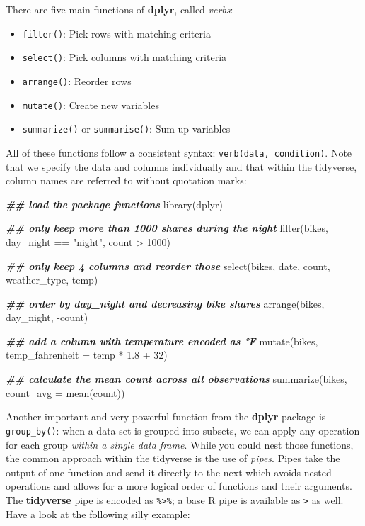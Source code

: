 \documentclass[
]{krantz}
\makeatletter
\newenvironment{Shaded}{\begin{snugshade}}{\end{snugshade}}
\newcommand{\AttributeTok}[1]{\textcolor[rgb]{0.61,0.61,0.61}{#1}}
\newcommand{\DecValTok}[1]{\textcolor[rgb]{0.06,0.06,0.06}{#1}}
\newcommand{\DocumentationTok}[1]{\textcolor[rgb]{0.37,0.37,0.37}{\textbf{\textit{#1}}}}
\newcommand{\FloatTok}[1]{\textcolor[rgb]{0.06,0.06,0.06}{#1}}
\newcommand{\FunctionTok}[1]{\textcolor[rgb]{0,0,0}{#1}}
\newcommand{\NormalTok}[1]{#1}
\newcommand{\SpecialCharTok}[1]{\textcolor[rgb]{0,0,0}{#1}}
\newcommand{\StringTok}[1]{\textcolor[rgb]{0.5,0.5,0.5}{#1}}
\providecommand{\tightlist}{%
  \setlength{\itemsep}{0pt}\setlength{\parskip}{0pt}}
\newenvironment{kframe}{%
\medskip{}
\setlength{\fboxsep}{.8em}
 \def\at@end@of@kframe{}%
 \ifinner\ifhmode%
  \def\at@end@of@kframe{\end{minipage}}%
  \begin{minipage}{\columnwidth}%
 \fi\fi%
 \def\FrameCommand##1{\hskip\@totalleftmargin \hskip-\fboxsep
 \colorbox{shadecolor}{##1}\hskip-\fboxsep
     \hskip-\linewidth \hskip-\@totalleftmargin \hskip\columnwidth}%
 \MakeFramed {\advance\hsize-\width
   \@totalleftmargin\z@ \linewidth\hsize
   \@setminipage}}%
 {\par\unskip\endMakeFramed%
 \at@end@of@kframe}
\renewenvironment{Shaded}{\begin{kframe}}{\end{kframe}}
\makeatother
\begin{document}
There are five main functions of \textbf{dplyr}, called \emph{verbs}:

\begin{itemize}
\tightlist
\item
  \texttt{filter()}: Pick rows with matching criteria
\item
  \texttt{select()}: Pick columns with matching criteria
\item
  \texttt{arrange()}: Reorder rows
\item
  \texttt{mutate()}: Create new variables
\item
  \texttt{summarize()} or \texttt{summarise()}: Sum up variables
\end{itemize}

All of these functions follow a consistent syntax: \texttt{verb(data,\ condition)}. Note that we specify the data and columns individually and that within the tidyverse, column names are referred to without quotation marks:

\begin{Shaded}
\begin{Highlighting}[]
\DocumentationTok{\#\# load the package functions}
\FunctionTok{library}\NormalTok{(dplyr)}

\DocumentationTok{\#\# only keep more than 1000 shares during the night}
\FunctionTok{filter}\NormalTok{(bikes, day\_night }\SpecialCharTok{==} \StringTok{"night"}\NormalTok{, count }\SpecialCharTok{\textgreater{}} \DecValTok{1000}\NormalTok{) }

\DocumentationTok{\#\# only keep 4 columns and reorder those}
\FunctionTok{select}\NormalTok{(bikes, date, count, weather\_type, temp) }

\DocumentationTok{\#\# order by day\_night and decreasing bike shares}
\FunctionTok{arrange}\NormalTok{(bikes, day\_night, }\SpecialCharTok{{-}}\NormalTok{count) }

\DocumentationTok{\#\# add a column with temperature encoded as °F}
\FunctionTok{mutate}\NormalTok{(bikes, }\AttributeTok{temp\_fahrenheit =}\NormalTok{ temp }\SpecialCharTok{*} \FloatTok{1.8} \SpecialCharTok{+} \DecValTok{32}\NormalTok{)}

\DocumentationTok{\#\# calculate the mean count across all observations}
\FunctionTok{summarize}\NormalTok{(bikes, }\AttributeTok{count\_avg =} \FunctionTok{mean}\NormalTok{(count)) }
\end{Highlighting}
\end{Shaded}

Another important and very powerful function from the \textbf{dplyr} package is \texttt{group\_by()}: when a data set is grouped into subsets, we can apply any operation for each group \emph{within a single data frame}. While you could nest those functions, the common approach within the tidyverse is the use of \emph{pipes}. Pipes take the output of one function and send it directly to the next which avoids nested operations and allows for a more logical order of functions and their arguments. The \textbf{tidyverse} pipe is encoded as \texttt{\%\textgreater{}\%}; a base R pipe is available as \texttt{\textbar{}\textgreater{}} as well. Have a look at the following silly example:
\end{document}
